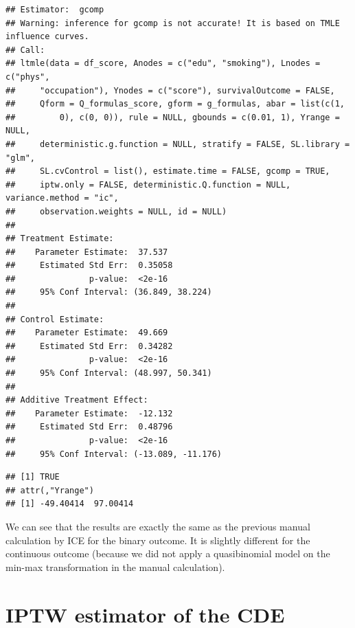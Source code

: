 \documentclass[
]{book}
\newenvironment{Shaded}{\begin{snugshade}}{\end{snugshade}}
\newcommand{\CommentTok}[1]{\textcolor[rgb]{0.56,0.35,0.01}{\textit{#1}}}
\newcommand{\NormalTok}[1]{#1}
\newcommand{\SpecialCharTok}[1]{\textcolor[rgb]{0.81,0.36,0.00}{\textbf{#1}}}
\begin{document}
\begin{verbatim}
## Estimator:  gcomp 
## Warning: inference for gcomp is not accurate! It is based on TMLE influence curves.
## Call:
## ltmle(data = df_score, Anodes = c("edu", "smoking"), Lnodes = c("phys", 
##     "occupation"), Ynodes = c("score"), survivalOutcome = FALSE, 
##     Qform = Q_formulas_score, gform = g_formulas, abar = list(c(1, 
##         0), c(0, 0)), rule = NULL, gbounds = c(0.01, 1), Yrange = NULL, 
##     deterministic.g.function = NULL, stratify = FALSE, SL.library = "glm", 
##     SL.cvControl = list(), estimate.time = FALSE, gcomp = TRUE, 
##     iptw.only = FALSE, deterministic.Q.function = NULL, variance.method = "ic", 
##     observation.weights = NULL, id = NULL)
## 
## Treatment Estimate:
##    Parameter Estimate:  37.537 
##     Estimated Std Err:  0.35058 
##               p-value:  <2e-16 
##     95% Conf Interval: (36.849, 38.224) 
## 
## Control Estimate:
##    Parameter Estimate:  49.669 
##     Estimated Std Err:  0.34282 
##               p-value:  <2e-16 
##     95% Conf Interval: (48.997, 50.341) 
## 
## Additive Treatment Effect:
##    Parameter Estimate:  -12.132 
##     Estimated Std Err:  0.48796 
##               p-value:  <2e-16 
##     95% Conf Interval: (-13.089, -11.176)
\end{verbatim}

\begin{Shaded}
\end{Shaded}

\begin{verbatim}
## [1] TRUE
## attr(,"Yrange")
## [1] -49.40414  97.00414
\end{verbatim}

We can see that the results are exactly the same as the previous manual calculation by ICE for the binary outcome. It is slightly different for the continuous outcome (because we did not apply a quasibinomial model on the min-max transformation in the manual calculation).

\section{IPTW estimator of the CDE}\label{iptw-estimator-of-the-cde}
\end{document}
